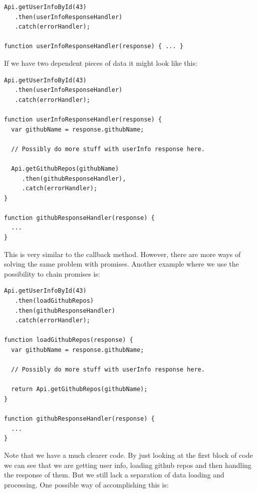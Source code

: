 \documentclass[a4paper,12pt]{article}
\begin{document}
\begin{lstlisting}[caption=Code showing how we can load a user's info with promises, frame=single]
Api.getUserInfoById(43)
   .then(userInfoResponseHandler)
   .catch(errorHandler);

function userInfoResponseHandler(response) { ... }
\end{lstlisting}
If we have two dependent pieces of data it might look like this:

\begin{lstlisting}[caption={Code showing an approach using promises where we are loading two pieces of data, where the second is dependent on the first}, frame=single]
Api.getUserInfoById(43)
   .then(userInfoResponseHandler)
   .catch(errorHandler);

function userInfoResponseHandler(response) {
  var githubName = response.githubName;

  // Possibly do more stuff with userInfo response here.

  Api.getGithubRepos(githubName)
     .then(githubResponseHandler), 
     .catch(errorHandler);
}

function githubResponseHandler(response) {
  ...
}
\end{lstlisting}
This is very similar to the callback method. However, there are more ways of solving the same problem with promises.
Another example where we use the possibility to chain promises is:

\begin{lstlisting}[caption={Code where we use promises and the possibility to chain promises to load two pieces of data, where the second is dependent on the first}, frame=single]
Api.getUserInfoById(43)
   .then(loadGithubRepos)
   .then(githubResponseHandler)
   .catch(errorHandler);

function loadGithubRepos(response) {
  var githubName = response.githubName;

  // Possibly do more stuff with userInfo response here.

  return Api.getGithubRepos(githubName);
}

function githubResponseHandler(response) {
  ...
}
\end{lstlisting}
Note that we have a much clearer code. By just looking at the first block of code we can see that we are getting user info, loading github repos and then handling the
response of them. But we still lack a separation of data loading and processing. One possible way of accomplishing this is:
\end{document}
